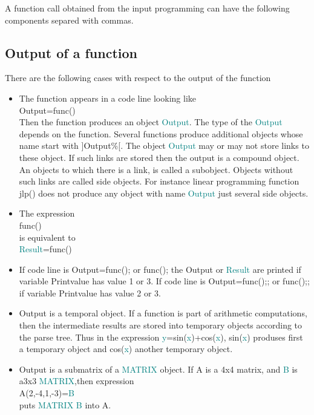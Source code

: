 { 
A function call obtained from the  input programming can have the 
following components separed with commas. 
\subsection{Output of a function} 
\label{output} 
 
There are the following cases with respect to 
the output of the function 
 
\begin{itemize} 
 
\item The function appears in a code line looking like\\ 
Output=func()\\ 
Then the function produces an object \textcolor{teal}{Output}. The type of the \textcolor{teal}{Output} depends on the function. 
Several functions produce additional objects whose name start with ]Output\%[. The 
object \textcolor{teal}{Output} may or may not store links to these object. If such links are 
stored then the output is a compound object. An objects to which there is a link, is called a subobject. 
Objects without such links are called side objects. For instance linear programming function \textcolor{VioletRed}{jlp}() 
does not produce any object with name \textcolor{teal}{Output} just several side objects. 
 
\item The expression \\ 
func()\\ 
is equivalent to\\ 
\textcolor{teal}{Result}=func() 
\item If code line is Output=func(); or func(); the Output or \textcolor{teal}{Result} are printed if 
variable Printvalue has value 1 or 3.  If code line is Output=func();; or func();; 
if variable Printvalue has value 2 or 3. 
 
\item Output is a temporal object. If a function is part of arithmetic computations, then 
the intermediate results are stored into temporary objects according to the parse tree. Thus in the 
expression \textcolor{teal}{y}=\textcolor{VioletRed}{sin}(\textcolor{teal}{x})+\textcolor{VioletRed}{cos}(\textcolor{teal}{x}), \textcolor{VioletRed}{sin}(\textcolor{teal}{x}) produses first a temporary object and \textcolor{VioletRed}{cos}(\textcolor{teal}{x}) 
another temporary object. 
\item Output is a submatrix of a \textcolor{teal}{MATRIX} object. If A is a 4x4 matrix, and 
\textcolor{teal}{B} is a3x3 \textcolor{teal}{MATRIX},then expression\\ 
A(2,-4,1,-3)=\textcolor{teal}{B}\\ 
puts \textcolor{teal}{MATRIX} \textcolor{teal}{B} into A. 
\end{itemize} 
}

